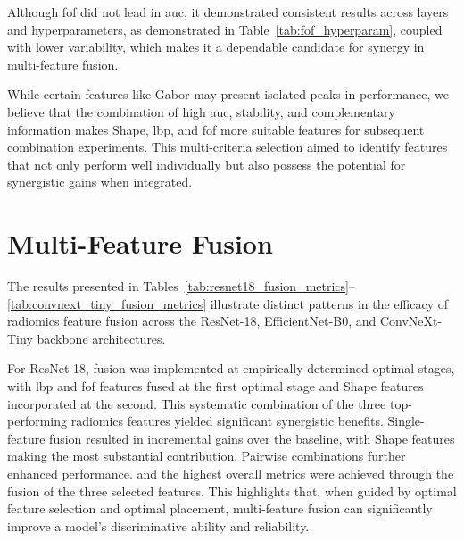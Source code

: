 Although \ac{fof} did not lead in \ac{auc}, it demonstrated consistent results across layers and hyperparameters, as demonstrated in Table~\ref{tab:fof_hyperparam}, coupled with lower variability, which makes it a dependable candidate for synergy in multi-feature fusion.

While certain features like Gabor may present isolated peaks in performance, we believe that the combination of high \ac{auc}, stability, and complementary information makes Shape, \ac{lbp}, and \ac{fof} more suitable features for subsequent combination experiments.
This multi-criteria selection aimed to identify features that not only perform well individually but also possess the potential for synergistic gains when integrated.


\section{Multi-Feature Fusion}

The results presented in Tables~\ref{tab:resnet18_fusion_metrics}--\ref{tab:convnext_tiny_fusion_metrics} illustrate distinct patterns in the efficacy of radiomics feature fusion across the ResNet-18, EfficientNet-B0, and ConvNeXt-Tiny backbone architectures.

For ResNet-18, fusion was implemented at empirically determined optimal stages, with \ac{lbp} and \ac{fof} features fused at the first optimal stage and Shape features incorporated at the second. This systematic combination of the three top-performing radiomics features yielded significant synergistic benefits. Single-feature fusion resulted in incremental gains over the baseline, with Shape features making the most substantial contribution. Pairwise combinations further enhanced performance. and the highest overall metrics were achieved through the fusion of the three selected features. This highlights that, when guided by optimal feature selection and optimal placement, multi-feature fusion can significantly improve a model's discriminative ability and reliability.


